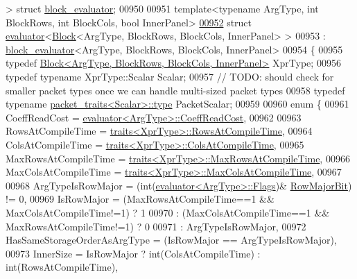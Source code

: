 \begin{DoxyCode}
      > \textcolor{keyword}{struct }\hyperlink{struct_eigen_1_1internal_1_1block__evaluator}{block\_evaluator};
00950          
00951 \textcolor{keyword}{template}<\textcolor{keyword}{typename} ArgType, \textcolor{keywordtype}{int} BlockRows, \textcolor{keywordtype}{int} BlockCols, \textcolor{keywordtype}{bool} InnerPanel> 
\hyperlink{struct_eigen_1_1internal_1_1evaluator_3_01_block_3_01_arg_type_00_01_block_rows_00_01_block_cols_00_01_inner_panel_01_4_01_4}{00952} \textcolor{keyword}{struct }\hyperlink{struct_eigen_1_1internal_1_1evaluator}{evaluator}<\hyperlink{group___core___module_class_eigen_1_1_block}{Block}<ArgType, BlockRows, BlockCols, InnerPanel> >
00953   : \hyperlink{struct_eigen_1_1internal_1_1block__evaluator}{block\_evaluator}<ArgType, BlockRows, BlockCols, InnerPanel>
00954 \{
00955   \textcolor{keyword}{typedef} \hyperlink{group___core___module_class_eigen_1_1_block}{Block<ArgType, BlockRows, BlockCols, InnerPanel>} 
      XprType;
00956   \textcolor{keyword}{typedef} \textcolor{keyword}{typename} XprType::Scalar Scalar;
00957   \textcolor{comment}{// TODO: should check for smaller packet types once we can handle multi-sized packet types}
00958   \textcolor{keyword}{typedef} \textcolor{keyword}{typename} \hyperlink{struct_eigen_1_1internal_1_1packet__traits}{packet\_traits<Scalar>::type} PacketScalar;
00959   
00960   \textcolor{keyword}{enum} \{
00961     CoeffReadCost = \hyperlink{struct_eigen_1_1internal_1_1evaluator}{evaluator<ArgType>::CoeffReadCost},
00962     
00963     RowsAtCompileTime = \hyperlink{struct_eigen_1_1internal_1_1traits}{traits<XprType>::RowsAtCompileTime},
00964     ColsAtCompileTime = \hyperlink{struct_eigen_1_1internal_1_1traits}{traits<XprType>::ColsAtCompileTime},
00965     MaxRowsAtCompileTime = \hyperlink{struct_eigen_1_1internal_1_1traits}{traits<XprType>::MaxRowsAtCompileTime},
00966     MaxColsAtCompileTime = \hyperlink{struct_eigen_1_1internal_1_1traits}{traits<XprType>::MaxColsAtCompileTime},
00967     
00968     ArgTypeIsRowMajor = (int(\hyperlink{struct_eigen_1_1internal_1_1evaluator}{evaluator<ArgType>::Flags})&
      \hyperlink{group__flags_gae4f56c2a60bbe4bd2e44c5b19cbe8762}{RowMajorBit}) != 0,
00969     IsRowMajor = (MaxRowsAtCompileTime==1 && MaxColsAtCompileTime!=1) ? 1
00970                : (MaxColsAtCompileTime==1 && MaxRowsAtCompileTime!=1) ? 0
00971                : ArgTypeIsRowMajor,
00972     HasSameStorageOrderAsArgType = (IsRowMajor == ArgTypeIsRowMajor),
00973     InnerSize = IsRowMajor ? int(ColsAtCompileTime) : int(RowsAtCompileTime),

\end{DoxyCode}
